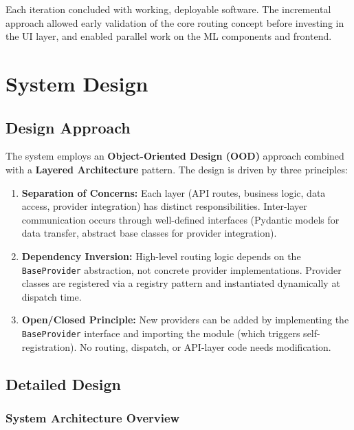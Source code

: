 \documentclass[12pt,a4paper]{report}
\begin{document}
Each iteration concluded with working, deployable software. The incremental approach allowed early validation of the core routing concept before investing in the UI layer, and enabled parallel work on the ML components and frontend.

\chapter{System Design}

\section{Design Approach}

The system employs an \textbf{Object-Oriented Design (OOD)} approach combined with a \textbf{Layered Architecture} pattern. The design is driven by three principles:

\begin{enumerate}[nosep]
    \item \textbf{Separation of Concerns:} Each layer (API routes, business logic, data access, provider integration) has distinct responsibilities. Inter-layer communication occurs through well-defined interfaces (Pydantic models for data transfer, abstract base classes for provider integration).
    \item \textbf{Dependency Inversion:} High-level routing logic depends on the \texttt{BaseProvider} abstraction, not concrete provider implementations. Provider classes are registered via a registry pattern and instantiated dynamically at dispatch time.
    \item \textbf{Open/Closed Principle:} New providers can be added by implementing the \texttt{BaseProvider} interface and importing the module (which triggers self-registration). No routing, dispatch, or API-layer code needs modification.
\end{enumerate}

\section{Detailed Design}

\subsection{System Architecture Overview}
\end{document}
